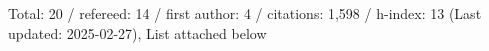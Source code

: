 Total: 20 / refereed: 14 / first author: 4 / citations: 1,598 / h-index: 13 (Last updated: 2025-02-27), List attached below